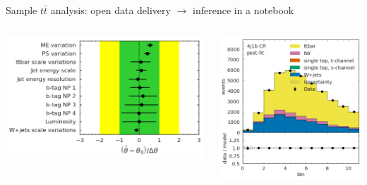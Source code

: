 \documentclass[aspectratio=169]{beamer}
\begin{document}
\begin{frame}{Sample $t\bar{t}$ analysis: open data delivery $\to$ inference in a notebook}
\begin{columns}
\begin{columns}
\vfill
\includegraphics[width=\linewidth]{PLOTS/gac-ttbar-plot-4.png}

\vfill
\includegraphics[width=\linewidth]{PLOTS/gac-ttbar-plot-7.png}


\end{columns}
\end{columns}
\end{frame}
\end{document}
